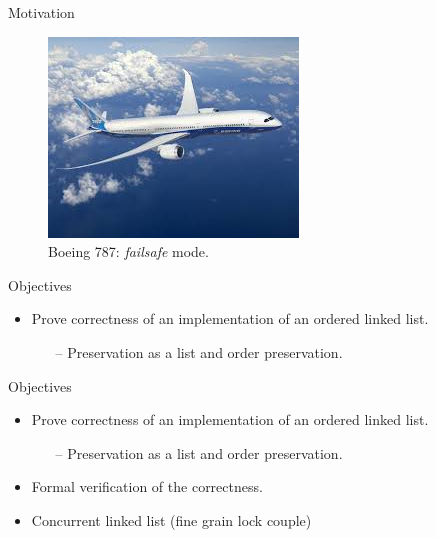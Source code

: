 \documentclass[10pt,notes,compress,usetitleprogressbar,aspectratio=1610]{beamer}
\begin{document}
\begin{frame}{Motivation}
	\begin{figure}
		\centering
		\includegraphics[scale=0.8]{imgs/boeing.jpg}
		\caption{Boeing 787: \textit{failsafe} mode.}
	\end{figure}
\end{frame}



\begin{frame}{Objectives}
\begin{itemize}
	\item Prove correctness of an implementation of an ordered linked list.
	\begin{itemize}
		\item[--] Preservation as a list and order preservation.
	\end{itemize}
	\begin{figure}
		
	\end{figure}
	\item[]
	\item[]
\end{itemize}
\end{frame}

\begin{frame}{Objectives}
\begin{itemize}
	\item Prove correctness of an implementation of an ordered linked list.
	\begin{itemize}
		\item[--] Preservation as a list and order preservation.
	\end{itemize}
	\begin{figure}
		
	\end{figure}
	\item  Formal verification of the correctness.
	\item Concurrent linked list (fine grain lock couple)
\end{itemize}
\end{frame}
\end{document}
